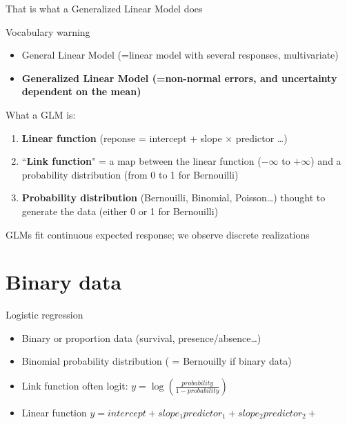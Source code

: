 \documentclass[10pt]{beamer}
\begin{document}
\begin{frame}{That is what a Generalized Linear Model does}

\begin{block}{Vocabulary warning}
  \begin{itemize}
    \item General Linear Model (=linear model with several responses, multivariate)
    \item \textbf{Generalized Linear Model (=non-normal errors, and uncertainty dependent on the mean)} 
  \end{itemize}
\end{block}

\pause

\begin{block}{What a GLM is:}
  \begin{enumerate}[<+->]
    \item \textbf{Linear function} (reponse = intercept + slope $\times$ predictor \dots)
    \item ``\textbf{Link function}" = a map between the linear function ($-\infty$ to $+\infty$) and a probability distribution (from 0 to 1 for Bernouilli)
    \item \textbf{Probability distribution} (Bernouilli, Binomial, Poisson\dots) thought to generate the data (either 0 or 1 for Bernouilli)
  \end{enumerate}
\pause[\thebeamerpauses]

GLMs fit continuous expected response; we observe discrete realizations
\end{block}

\end{frame}


\section{Binary data}

\begin{frame}{Logistic regression}

  \begin{block}{}
   
\begin{itemize}[<+->]
    \item Binary or proportion data (survival, presence/absence\dots)
    \item Binomial probability distribution ( = Bernouilly if binary data)
    \item Link function often logit: $y=\log(\frac{probability}{1-probability})$
    \item Linear function $y = intercept + slope_1 predictor_1 + slope_2 predictor_2 +$
  \end{itemize}
  
  
  \end{block}

  \end{frame}
  
\end{document}
